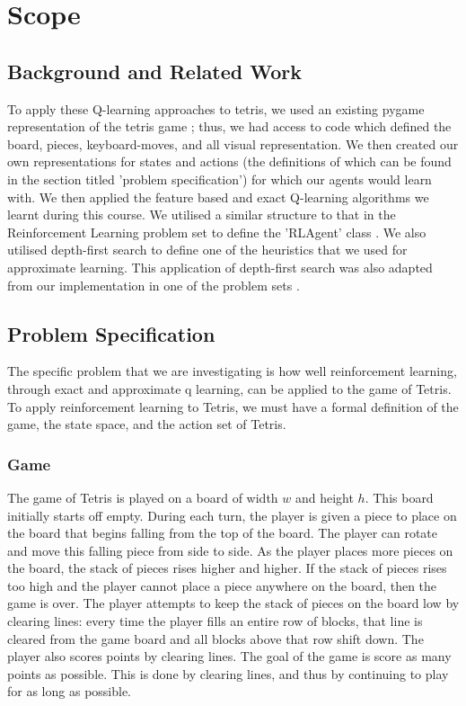 \documentclass[11pt]{article}
\begin{document}
\section{Scope}

\subsection{Background and Related Work}
To apply these Q-learning approaches to tetris, we used an existing pygame representation of the tetris game \cite{WEBSITE:1}; thus, we had access to code which defined the board, pieces, keyboard-moves, and all visual representation. We then created our own representations for states and actions (the definitions of which can be found in the section titled 'problem specification') for which our agents would learn with. We then applied the feature based and exact Q-learning algorithms we learnt during this course. We utilised a similar structure to that in the Reinforcement Learning problem set to define the 'RLAgent' class \cite{CODE:1}. We also utilised depth-first search to define one of the heuristics that we used for approximate learning. This application of depth-first search was also adapted from our implementation in one of the problem sets \cite{CODE:2}.

\subsection{Problem Specification}
The specific problem that we are investigating is how well reinforcement learning, through exact and approximate q learning, can be applied to the game of Tetris. To apply reinforcement learning to Tetris, we must have a formal definition of the game, the state space, and the action set of Tetris.

\subsubsection{Game}
The game of Tetris is played on a board of width $w$ and height $h$. This board initially starts off empty. During each turn, the player is given a piece to place on the board that begins falling from the top of the board. The player can rotate and move this falling piece from side to side. As the player places more pieces on the board, the stack of pieces rises higher and higher. If the stack of pieces rises too high and the player cannot place a piece anywhere on the board, then the game is over. The player attempts to keep the stack of pieces on the board low by clearing lines: every time the player fills an entire row of blocks, that line is cleared from the game board and all blocks above that row shift down. The player also scores points by clearing lines. The goal of the game is score as many points as possible. This is done by clearing lines, and thus by continuing to play for as long as possible.
\end{document}
